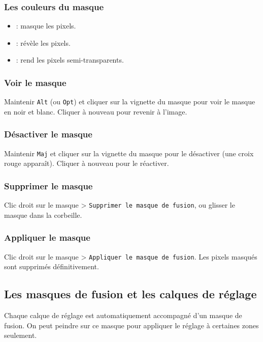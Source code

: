 \subsubsection{Les couleurs du masque}

\begin{itemize}
    \item {} : masque les pixels.
    \item {} : révèle les pixels.
    \item {} : rend les pixels semi-transparents.
\end{itemize}

\subsubsection{Voir le masque}

Maintenir \texttt{Alt} (ou \texttt{Opt}) et cliquer sur la vignette du masque pour voir le masque en noir et blanc. Cliquer à nouveau pour revenir à l'image.

\subsubsection{Désactiver le masque}

Maintenir \texttt{Maj} et cliquer sur la vignette du masque pour le désactiver (une croix rouge apparaît). Cliquer à nouveau pour le réactiver.

\subsubsection{Supprimer le masque}

Clic droit sur le masque > \texttt{Supprimer le masque de fusion}, ou glisser le masque dans la corbeille.

\subsubsection{Appliquer le masque}

Clic droit sur le masque > \texttt{Appliquer le masque de fusion}. Les pixels masqués sont supprimés définitivement.

\subsection{Les masques de fusion et les calques de réglage}

Chaque calque de réglage est automatiquement accompagné d'un masque de fusion. On peut peindre sur ce masque pour appliquer le réglage à certaines zones seulement.

